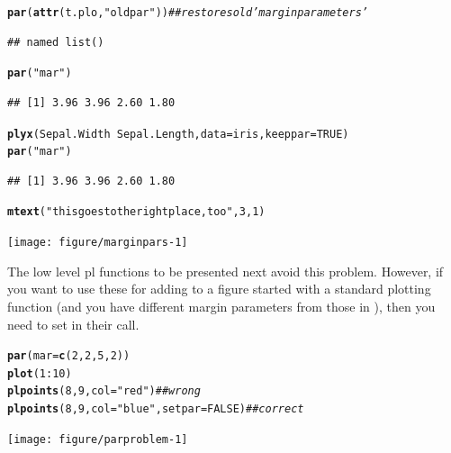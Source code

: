 \documentclass[11pt]{article}\usepackage[]{graphicx}\usepackage[]{color}
\makeatletter
\newcommand{\hlnum}[1]{\textcolor[rgb]{0.686,0.059,0.569}{#1}}%
\newcommand{\hlstr}[1]{\textcolor[rgb]{0.192,0.494,0.8}{#1}}%
\newcommand{\hlcom}[1]{\textcolor[rgb]{0.678,0.584,0.686}{\textit{#1}}}%
\newcommand{\hlopt}[1]{\textcolor[rgb]{0,0,0}{#1}}%
\newcommand{\hlstd}[1]{\textcolor[rgb]{0.345,0.345,0.345}{#1}}%
\newcommand{\hlkwc}[1]{\textcolor[rgb]{0.333,0.667,0.333}{#1}}%
\newcommand{\hlkwd}[1]{\textcolor[rgb]{0.737,0.353,0.396}{\textbf{#1}}}%
\newenvironment{kframe}{%
 \def\at@end@of@kframe{}%
 \ifinner\ifhmode%
  \def\at@end@of@kframe{\end{minipage}}%
  \begin{minipage}{\columnwidth}%
 \fi\fi%
 \def\FrameCommand##1{\hskip\@totalleftmargin \hskip-\fboxsep
 \colorbox{shadecolor}{##1}\hskip-\fboxsep
     \hskip-\linewidth \hskip-\@totalleftmargin \hskip\columnwidth}%
 \MakeFramed {\advance\hsize-\width
   \@totalleftmargin\z@ \linewidth\hsize
   \@setminipage}}%
 {\par\unskip\endMakeFramed%
 \at@end@of@kframe}
\newenvironment{knitrout}{}{} %
\makeatother
\begin{document}
\begin{knitrout}
\begin{kframe}
\begin{alltt}
\hlkwd{par}\hlstd{(}\hlkwd{attr}\hlstd{(t.plo,} \hlstr{"oldpar"}\hlstd{))}  \hlcom{## restores old 'margin parameters' }
\end{alltt}
\begin{verbatim}
## named list()
\end{verbatim}
\begin{alltt}
\hlkwd{par}\hlstd{(}\hlstr{"mar"}\hlstd{)}
\end{alltt}
\begin{verbatim}
## [1] 3.96 3.96 2.60 1.80
\end{verbatim}
\begin{alltt}
\hlkwd{plyx}\hlstd{(Sepal.Width}\hlopt{~}\hlstd{Sepal.Length,} \hlkwc{data}\hlstd{=iris,} \hlkwc{keeppar}\hlstd{=}\hlnum{TRUE}\hlstd{)}
\hlkwd{par}\hlstd{(}\hlstr{"mar"}\hlstd{)}
\end{alltt}
\begin{verbatim}
## [1] 3.96 3.96 2.60 1.80
\end{verbatim}
\begin{alltt}
\hlkwd{mtext}\hlstd{(}\hlstr{"this goes to the right place, too"}\hlstd{,}\hlnum{3}\hlstd{,}\hlnum{1}\hlstd{)}
\end{alltt}
\end{kframe}
\texttt{[image: figure/marginpars-1]} 

\end{knitrout}

The low level pl functions to be presented next avoid this problem.
However, if you want to use these for adding to a figure started with
a standard plotting function (and you have different margin parameters
from those in ), then you need to set 
in their call.
\begin{knitrout}
\color{fgcolor}\begin{kframe}
\begin{alltt}
\hlkwd{par}\hlstd{(}\hlkwc{mar}\hlstd{=}\hlkwd{c}\hlstd{(}\hlnum{2}\hlstd{,}\hlnum{2}\hlstd{,}\hlnum{5}\hlstd{,}\hlnum{2}\hlstd{))}
\hlkwd{plot}\hlstd{(}\hlnum{1}\hlopt{:}\hlnum{10}\hlstd{)}
\hlkwd{plpoints}\hlstd{(}\hlnum{8}\hlstd{,}\hlnum{9}\hlstd{,} \hlkwc{col}\hlstd{=}\hlstr{"red"}\hlstd{)} \hlcom{## wrong}
\hlkwd{plpoints}\hlstd{(}\hlnum{8}\hlstd{,}\hlnum{9}\hlstd{,} \hlkwc{col}\hlstd{=}\hlstr{"blue"}\hlstd{,} \hlkwc{setpar}\hlstd{=}\hlnum{FALSE}\hlstd{)} \hlcom{## correct}
\end{alltt}
\end{kframe}
\texttt{[image: figure/parproblem-1]} 

\end{knitrout}
\end{document}
